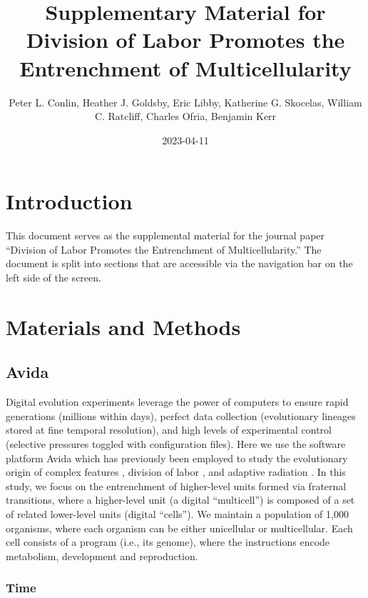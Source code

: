 \documentclass[
]{book}
\title{Supplementary Material for Division of Labor Promotes the Entrenchment of Multicellularity}
\author{Peter L. Conlin, Heather J. Goldsby, Eric Libby, Katherine G. Skocelas, William C. Ratcliff, Charles Ofria, Benjamin Kerr}
\date{2023-04-11}
\begin{document}
\maketitle

{
\setcounter{tocdepth}{1}
\tableofcontents
}
\hypertarget{introduction}{%
\chapter{Introduction}\label{introduction}}

This document serves as the supplemental material for the journal paper ``Division of Labor Promotes the Entrenchment of Multicellularity.'' The document is split into sections that are accessible via the navigation bar on the left side of the screen.

\hypertarget{materials-and-methods}{%
\chapter{Materials and Methods}\label{materials-and-methods}}

\hypertarget{avida}{%
\section{Avida}\label{avida}}

Digital evolution experiments leverage the power of computers to ensure rapid generations (millions within days), perfect data collection (evolutionary lineages stored at fine temporal resolution), and high levels of experimental control (selective pressures toggled with configuration files). Here we use the software platform Avida \citep{ofria2004avida} which has previously been employed to study the evolutionary origin of complex features \citep{Lenski2003}, division of labor \citep{goldsby2012task, goldsby2014evolutionary}, and adaptive radiation \citep{Chow2004}. In this study, we focus on the entrenchment of higher-level units formed via fraternal transitions, where a higher-level unit (a digital ``multicell'') is composed of a set of related lower-level units (digital ``cells''). We maintain a population of 1,000 organisms, where each organism can be either unicellular or multicellular. Each cell consists of a program (i.e., its genome), where the instructions encode metabolism, development and reproduction.

\hypertarget{time}{%
\subsection{Time}\label{time}}
\end{document}
